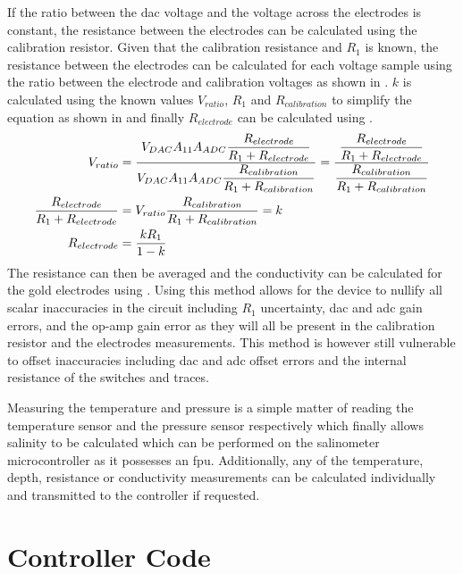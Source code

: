 If the ratio between the \gls{dac} voltage and the voltage across the electrodes is constant, the resistance between the electrodes can be calculated using the calibration resistor.
Given that the calibration resistance and $R_1$ is known, the resistance between the electrodes can be calculated for each voltage sample using the ratio between the electrode and calibration voltages as shown in .
$k$ is calculated using the known values $V_{ratio}$, $R_1$ and $R_{calibration}$ to simplify the equation as shown in  and finally $R_{electrode}$ can be calculated using .
\begin{align}
    V_{ratio} &= \frac{\displaystyle V_{DAC}A_{11}A_{ADC}\frac{\displaystyle R_{electrode}}{\displaystyle R_1 + R_{electrode}}}{\displaystyle V_{DAC}A_{11}A_{ADC}\frac{\displaystyle R_{calibration}}{\displaystyle R_1 + R_{calibration}}} = \frac{\displaystyle \frac{\displaystyle R_{electrode}}{\displaystyle R_1 + R_{electrode}}}{\displaystyle \frac{\displaystyle R_{calibration}}{\displaystyle R_1 + R_{calibration}}} \label{eqn:electrode-calib-resistance} \\
    \frac{\displaystyle R_{electrode}}{\displaystyle R_1 + R_{electrode}} &= V_{ratio} \frac{\displaystyle R_{calibration}}{\displaystyle R_1 + R_{calibration}} = k \label{eqn:electrode-calib-resistance-simplified} \\
    R_{electrode} &= \frac{\displaystyle kR_1}{\displaystyle 1 - k} \label{eqn:electrode-calib-resistance-final}
\end{align}
The resistance can then be averaged and the conductivity can be calculated for the gold electrodes using .
Using this method allows for the device to nullify all scalar inaccuracies in the circuit including $R_1$ uncertainty, \gls{dac} and \gls{adc} gain errors, and the op-amp gain error as they will all be present in the calibration resistor and the electrodes measurements.
This method is however still vulnerable to offset inaccuracies including \gls{dac} and \gls{adc} offset errors and the internal resistance of the switches and traces.

Measuring the temperature and pressure is a simple matter of reading the temperature sensor and the pressure sensor respectively which finally allows salinity to be calculated which can be performed on the salinometer microcontroller as it possesses an \gls{fpu}.
Additionally, any of the temperature, depth, resistance or conductivity measurements can be calculated individually and transmitted to the controller if requested.

\section{Controller Code}

